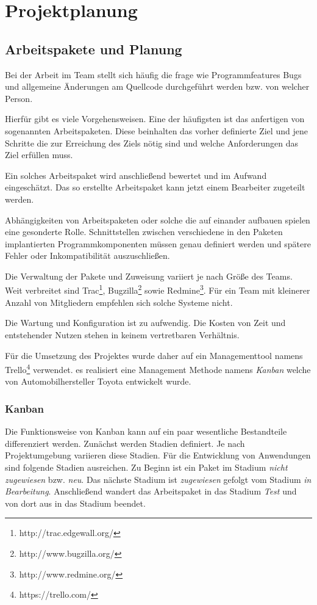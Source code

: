\section{Projektplanung}
\label{proj}
\subsection{Arbeitspakete und Planung}
Bei der Arbeit im Team stellt sich häufig die frage wie Programmfeatures Bugs und allgemeine Änderungen am Quellcode durchgeführt werden bzw. von welcher Person.

Hierfür gibt es viele Vorgehensweisen. Eine der häufigsten ist das anfertigen von sogenannten Arbeitspaketen. Diese beinhalten das vorher definierte Ziel und jene Schritte die zur Erreichung des Ziels nötig sind und welche Anforderungen das Ziel erfüllen muss.

Ein solches Arbeitspaket wird anschließend bewertet und im Aufwand eingeschätzt. Das so erstellte Arbeitspaket kann jetzt einem Bearbeiter zugeteilt werden.

Abhängigkeiten von Arbeitspaketen oder solche die auf einander aufbauen spielen eine gesonderte Rolle. Schnittstellen zwischen verschiedene in den Paketen implantierten Programmkomponenten müssen genau definiert werden und spätere Fehler oder Inkompatibilität auszuschließen.

Die Verwaltung der Pakete und Zuweisung variiert je nach Größe des Teams. Weit verbreitet sind Trac\footnote{http://trac.edgewall.org/}, Bugzilla\footnote{http://www.bugzilla.org/} sowie Redmine\footnote{http://www.redmine.org/}. Für ein Team mit kleinerer Anzahl von Mitgliedern empfehlen sich solche Systeme nicht.

Die Wartung und Konfiguration ist zu aufwendig. Die Kosten von Zeit und entstehender Nutzen stehen in keinem vertretbaren Verhältnis.

Für die Umsetzung des Projektes wurde daher auf ein Managementtool namens Trello\footnote{https://trello.com/} verwendet. es realisiert eine Management Methode namens \textit{Kanban} welche von Automobilhersteller Toyota entwickelt wurde.

\subsubsection{Kanban}

Die Funktionsweise von Kanban kann auf ein paar wesentliche Bestandteile differenziert werden. Zunächst werden Stadien definiert. Je nach Projektumgebung variieren diese Stadien. Für die Entwicklung von Anwendungen sind folgende Stadien ausreichen. Zu Beginn ist ein Paket im Stadium \textit{nicht zugewiesen} bzw. \textit{neu}. Das nächste Stadium ist \textit{zugewiesen} gefolgt vom Stadium \textit{in Bearbeitung}. Anschließend wandert das Arbeitspaket in das Stadium \textit{Test} und von dort aus in das Stadium beendet.

